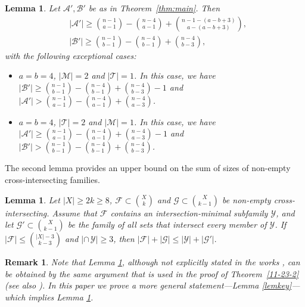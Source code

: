 \documentclass[11pt]{article}
\newcommand{\m}{\mathcal}
\newtheorem{lemma}[theorem]{Lemma}
\newtheorem*{remark*}{Remark} %
\begin{document}
\begin{lemma}\label{11-23-3}
Let $\mathcal{A}', \mathcal{B}'$ be as in Theorem~\ref{thm:main}. Then
\begin{align}\label{11-30-1}
&|\mathcal{A}'|\ge {n-1\choose a-1}-{n-4\choose a-1}+{n-1-(a-b+3)\choose a-(a-b+3)},\\ 
\label{11-30-2}
&|\mathcal{B}'|\ge {n-1\choose b-1}-{n-4\choose b-1}+{n-4\choose b-3},
\end{align}
with the following exceptional cases:
\begin{itemize}
\item  $a=b=4$, $|\mathcal{M}|=2$ and $|\mathcal{T}|=1$. In this case, we have  $|\mathcal{B}'| \ge {n-1\choose b-1}-{n-4\choose b-1}+{n-4\choose b-3}-1$ and  $|\mathcal{A}'| > {n-1\choose a-1}-{n-4\choose a-1}+{n-4\choose a-3}$. 
\item $a=b=4$, $|\mathcal{T}|=2$ and $|\mathcal{M}|=1$. In this case, we have  $|\mathcal{A}'| \ge {n-1\choose a-1}-{n-4\choose a-1}+{n-4\choose a-3}-1$ and  $|\mathcal{B}'| > {n-1\choose b-1}-{n-4\choose b-1}+{n-4\choose b-3}$. 
\end{itemize}
\end{lemma}

The second lemma provides an upper bound on the sum of sizes of non-empty cross-intersecting families. 


\begin{lemma}\label{lemf}
Let $|X|\ge 2k\ge 8$, $\m F\subset {X\choose k}$ and $\m G\subset {X\choose k-1}$ be non-empty cross-intersecting. 
Assume that  $\m F$ contains an intersection-minimal subfamily $\m Y$, and let $\m G'\subset{X\choose k-1}$ be the family of all sets that intersect every member of $\m Y$. 
If $|\m F|\le {|X|-3\choose k-3}$ and $|\cap \, \m Y|\ge 3$,
then  
$|\m F|+|\m G|\le |\m Y|+|\m G'|.$
\end{lemma}

\begin{remark*}
Note that Lemma \ref{lemf}, although not explicitly stated in the works \cite{Kup2018, 11-23-2}, can be obtained by the same argument that is used in the proof of Theorem~\ref{11-23-2} (see also \cite{Kup2018, 11-23-2}). 
In this paper we prove a more general statement—Lemma \ref{lemkey}—which implies Lemma \ref{lemf}.
\end{remark*}
\end{document}
